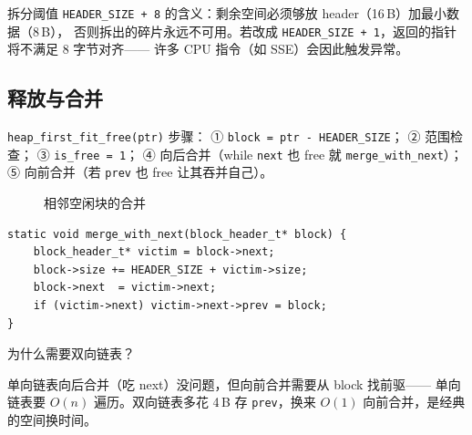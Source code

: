 \begin{thinkbox}
拆分阈值 \texttt{HEADER\_SIZE + 8} 的含义：剩余空间必须够放 header（16\,B）加最小数据（8\,B），
否则拆出的碎片永远不可用。若改成 \texttt{HEADER\_SIZE + 1}，返回的指针将不满足 8 字节对齐——
许多 CPU 指令（如 SSE）会因此触发异常。
\end{thinkbox}

\subsection{释放与合并}

\texttt{heap\_first\_fit\_free(ptr)} 步骤：
① \texttt{block = ptr - HEADER\_SIZE}；
② 范围检查；
③ \texttt{is\_free = 1}；
④ 向后合并（while \texttt{next} 也 free 就 \texttt{merge\_with\_next}）；
⑤ 向前合并（若 \texttt{prev} 也 free 让其吞并自己）。

\begin{figure}[H]
  \centering
  
  \caption{相邻空闲块的合并}
  \label{fig:block-coalesce}
\end{figure}

\begin{lstlisting}[style=cstyle]
static void merge_with_next(block_header_t* block) {
    block_header_t* victim = block->next;
    block->size += HEADER_SIZE + victim->size;
    block->next  = victim->next;
    if (victim->next) victim->next->prev = block;
}
\end{lstlisting}

\begin{whybox}
为什么需要双向链表？

单向链表向后合并（吃 next）没问题，但向前合并需要从 block 找前驱——
单向链表要 $O(n)$ 遍历。双向链表多花 4\,B 存 \texttt{prev}，换来
$O(1)$ 向前合并，是经典的空间换时间。
\end{whybox}


